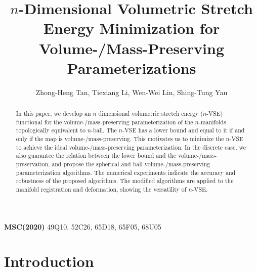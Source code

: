 \documentclass{article}
\title{$n$-Dimensional Volumetric Stretch Energy Minimization for Volume-/Mass-Preserving Parameterizations}
\author{Zhong-Heng Tan, Tiexiang Li, Wen-Wei Lin, Shing-Tung Yau}
\date{}
\begin{document}
\maketitle

\begin{abstract}
    In this paper, we develop an $n$ dimensional volumetric stretch energy ($n$-VSE) functional for the volume-/mass-preserving parameterization of the $n$-manifolds topologically equivalent to $n$-ball. The $n$-VSE has a lower bound and equal to it if and only if the map is volume-/mass-preserving. This motivates us to minimize the $n$-VSE to achieve the ideal volume-/mass-preserving parameterization. In the discrete case, we also guarantee the relation between the lower bound and the volume-/mass-preservation, and propose the spherical and ball volume-/mass-preserving parameterization algorithms. The numerical experiments indicate the accuracy and robustness of the proposed algorithms. The modified algorithms are applied to the manifold registration and deformation, showing the versatility of $n$-VSE.
\end{abstract}


\textbf{MSC(2020)}   49Q10, 52C26, 65D18, 65F05, 68U05

\section{Introduction}
\end{document}
